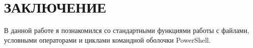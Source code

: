 \section*{ЗАКЛЮЧЕНИЕ}

В данной работе я познакомился со стандартными функциями работы с файлами, условными операторами и циклами
командной оболочки PowerShell.

\newpage
